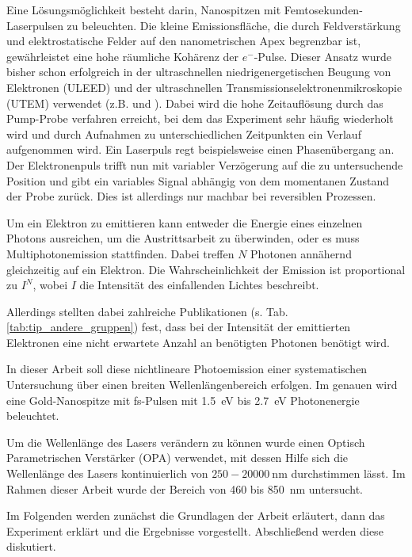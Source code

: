 \documentclass[bachelor,       %
               twoside,        %
               BCOR10mm,       %
               english,ngerman, %
               ]{GAUBM}
\begin{document}
Eine Lösungsmöglichkeit besteht darin, Nanospitzen mit Femtosekunden-Laserpulsen zu beleuchten.
Die kleine Emissionsfläche, die durch Feldverstärkung und elektrostatische Felder auf den nanometrischen Apex begrenzbar ist, gewährleistet eine hohe räumliche Kohärenz der $e^-$-Pulse.
Dieser Ansatz wurde bisher schon erfolgreich in der ultraschnellen niedrigenergetischen Beugung von Elektronen (ULEED) und der ultraschnellen Transmissionselektronenmikroskopie (UTEM) verwendet (z.B. \cite{gulde_ultrafast_2014} und \cite{barwick_4d_2008}).
Dabei wird die hohe Zeitauflösung durch das Pump-Probe verfahren erreicht, bei dem das Experiment sehr häufig wiederholt wird und durch Aufnahmen zu unterschiedlichen Zeitpunkten ein Verlauf aufgenommen wird.
Ein Laserpuls regt beispielsweise einen Phasenübergang an.
Der Elektronenpuls trifft nun mit variabler Verzögerung auf die zu untersuchende Position und gibt ein variables Signal abhängig von dem momentanen Zustand der Probe zurück.
Dies ist allerdings nur machbar bei reversiblen Prozessen.

Um ein Elektron zu emittieren kann entweder die Energie eines einzelnen Photons ausreichen, um die Austrittsarbeit zu überwinden, oder es muss Multiphotonemission stattfinden.
Dabei treffen $N$ Photonen annähernd gleichzeitig auf ein Elektron.
Die Wahrscheinlichkeit der Emission ist proportional zu $I^N$, wobei $I$ die Intensität des einfallenden Lichtes beschreibt.

Allerdings stellten dabei zahlreiche Publikationen (s. Tab. \ref{tab:tip_andere_gruppen}) fest, dass bei der Intensität der emittierten Elektronen eine nicht erwartete Anzahl an benötigten Photonen benötigt wird.

In dieser Arbeit soll diese nichtlineare Photoemission einer systematischen Untersuchung über einen breiten Wellenlängenbereich erfolgen. Im genauen wird eine Gold-Nanospitze mit fs-Pulsen mit \SI{1.5}{\eV} bis \SI{2.7}{\eV} Photonenergie beleuchtet.

Um die Wellenlänge des Lasers verändern zu können wurde einen Optisch Parametrischen Verstärker (OPA) verwendet, mit dessen Hilfe sich die Wellenlänge des Lasers kontinuierlich von $250-\SI{20000}{\nano\meter}$ durchstimmen lässt.
Im Rahmen dieser Arbeit wurde der Bereich von 460 bis \SI{850}{\nm} untersucht.\newline\newline

Im Folgenden werden zunächst die Grundlagen der Arbeit erläutert, dann das Experiment erklärt und die Ergebnisse vorgestellt. Abschließend werden diese diskutiert.
\end{document}
